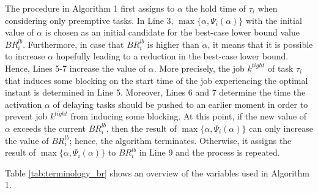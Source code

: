 \documentclass[fleqn]{article}
\begin{document}
The procedure in Algorithm 1 first assigns to $\alpha$ the hold time of $\tau_i$ when considering only preemptive tasks. In Line 3, $\max \{ \alpha, \Psi_i(\alpha)\}$ with the initial value of $\alpha$ is chosen as an initial candidate for the best-case lower bound value $BR_i^{lb}$. Furthermore, in case that $BR^{lb}_i$ is higher than $\alpha$, it means that it is possible to increase $\alpha$ hopefully leading to a reduction in the best-case lower bound. Hence, Lines 5-7 increase the value of $\alpha$. More precisely, the job $k^{tight}$ of task $\tau_i$ that induces some blocking on the start time of the job experiencing the optimal instant is determined in Line 5. Moreover, Lines 6 and 7 determine the time the activation $\alpha$ of delaying tasks should be pushed to an earlier moment in order to prevent job $k^{tight}$ from inducing some blocking. At this point, if the new value of $\alpha$ exceeds the current $BR^{lb}_i$, then the result of $\max \{ \alpha, \Psi_i(\alpha)\}$ can only increase the value of $BR^{lb}_i$; hence, the algorithm terminates. Otherwise, it assigns the result of $\max \{ \alpha, \Psi_i(\alpha)\}$ to $BR^{lb}_i$ in Line 9 and the process is repeated. 

Table \ref{tab:terminology_br} shows an overview of the variables used in Algorithm 1.


%
\end{document}

